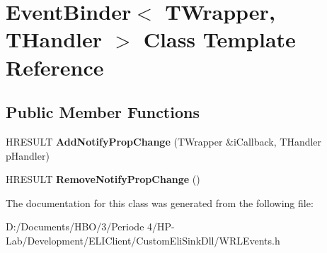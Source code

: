 \hypertarget{class_event_binder}{}\section{Event\+Binder$<$ T\+Wrapper, T\+Handler $>$ Class Template Reference}
\label{class_event_binder}
\subsection*{Public Member Functions}
\begin{DoxyCompactItemize}
\item 
\mbox{\label{class_event_binder_a77bbbeb73a3c35355fe261e3027e8a10}} 
H\+R\+E\+S\+U\+LT {\bfseries Add\+Notify\+Prop\+Change} (T\+Wrapper \&i\+Callback, T\+Handler p\+Handler)
\item 
\mbox{\label{class_event_binder_a70b437fd625e1c510a0e0e32ef09e4c8}} 
H\+R\+E\+S\+U\+LT {\bfseries Remove\+Notify\+Prop\+Change} ()
\end{DoxyCompactItemize}


The documentation for this class was generated from the following file\+:\begin{DoxyCompactItemize}
\item 
D\+:/\+Documents/\+H\+B\+O/3/\+Periode 4/\+H\+P-\/\+Lab/\+Development/\+E\+L\+I\+Client/\+Custom\+Eli\+Sink\+Dll/W\+R\+L\+Events.\+h\end{DoxyCompactItemize}
